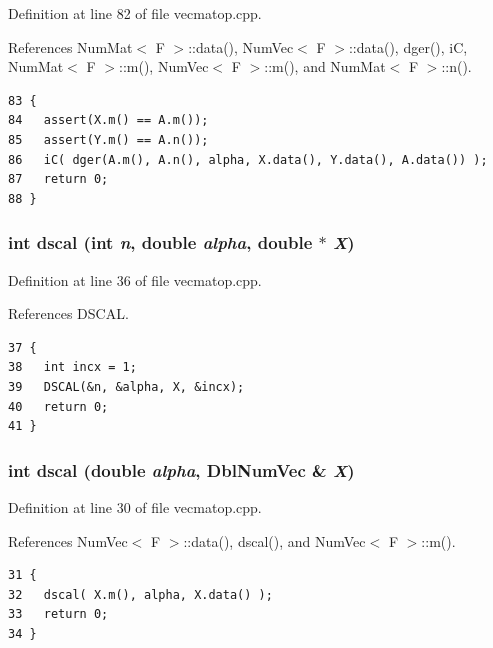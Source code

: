 Definition at line 82 of file vecmatop.cpp.

References Num\-Mat$<$ F $>$::data(), Num\-Vec$<$ F $>$::data(), dger(), i\-C, Num\-Mat$<$ F $>$::m(), Num\-Vec$<$ F $>$::m(), and Num\-Mat$<$ F $>$::n().

\footnotesize\begin{verbatim}83 {
84   assert(X.m() == A.m());
85   assert(Y.m() == A.n());
86   iC( dger(A.m(), A.n(), alpha, X.data(), Y.data(), A.data()) );
87   return 0;
88 }
\end{verbatim}\normalsize 


\subsubsection{\setlength{\rightskip}{0pt plus 5cm}int dscal (int {\em n}, double {\em alpha}, double $\ast$ {\em X})}\label{vecmatop_8hpp_7358d64948ad9a47cf0744506e881c1d_7358d64948ad9a47cf0744506e881c1d}




Definition at line 36 of file vecmatop.cpp.

References DSCAL.

\footnotesize\begin{verbatim}37 {
38   int incx = 1;
39   DSCAL(&n, &alpha, X, &incx);
40   return 0;
41 }
\end{verbatim}\normalsize 


\subsubsection{\setlength{\rightskip}{0pt plus 5cm}int dscal (double {\em alpha}, {\bf Dbl\-Num\-Vec} \& {\em X})}\label{vecmatop_8hpp_3b4887d360a4d7483a4a1060d10012f7_3b4887d360a4d7483a4a1060d10012f7}




Definition at line 30 of file vecmatop.cpp.

References Num\-Vec$<$ F $>$::data(), dscal(), and Num\-Vec$<$ F $>$::m().

\footnotesize\begin{verbatim}31 {
32   dscal( X.m(), alpha, X.data() );
33   return 0;
34 }
\end{verbatim}\normalsize 


